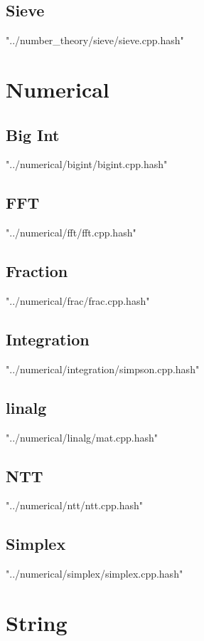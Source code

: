 \documentclass [12pt,onecolumn,oneside]{article}
\begin{document}
\subsection{ Sieve}
 {"../number_theory/sieve/sieve.cpp.hash"}
\newpage


\section{Numerical}
\subsection{ Big Int}
 {"../numerical/bigint/bigint.cpp.hash"}
\newpage

\subsection{ FFT}
 {"../numerical/fft/fft.cpp.hash"}
\newpage

\subsection{ Fraction}
 {"../numerical/frac/frac.cpp.hash"}
\newpage

\subsection{ Integration}
 {"../numerical/integration/simpson.cpp.hash"}
\newpage

\subsection{ linalg}
 {"../numerical/linalg/mat.cpp.hash"}
\newpage

\subsection{ NTT}
 {"../numerical/ntt/ntt.cpp.hash"}
\newpage

\subsection{ Simplex}
 {"../numerical/simplex/simplex.cpp.hash"}
\newpage


\section{String}
\end{document}
